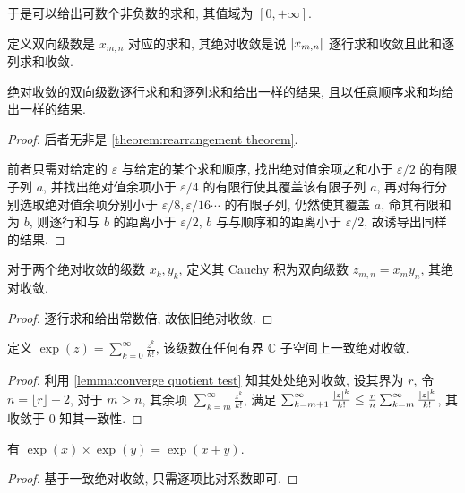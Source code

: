 于是可以给出可数个非负数的求和, 其值域为 \([0,+\infty]\).

\begin{definition}
    定义双向级数是 \(x_{m,n}\) 对应的求和, 其绝对收敛是说 \(\abs{x_{m,n}}\) 逐行求和收敛且此和逐列求和收敛.
\end{definition}

\begin{lemma}
    绝对收敛的双向级数逐行求和和逐列求和给出一样的结果, 且以任意顺序求和均给出一样的结果.

    \begin{proof}
        后者无非是 \ref{theorem:rearrangement theorem}.

        前者只需对给定的 \(\varepsilon\) 与给定的某个求和顺序, 找出绝对值余项之和小于 \(\varepsilon/2\) 的有限子列 \(a\),
        并找出绝对值余项小于 \(\varepsilon/4\) 的有限行使其覆盖该有限子列 \(a\), 再对每行分别选取绝对值余项分别小于 \(\varepsilon/8,\varepsilon/16 \cdots\) 的有限子列,
        仍然使其覆盖 \(a\), 命其有限和为 \(b\), 则逐行和与 \(b\) 的距离小于 \(\varepsilon/2\), \(b\) 与与顺序和的距离小于 \(\varepsilon/2\), 故诱导出同样的结果.
    \end{proof}
\end{lemma}

\begin{definition}[Cauchy 积]
    对于两个绝对收敛的级数 \(x_k,y_k\), 定义其 Cauchy 积为双向级数 \(z_{m,n} = x_m y_n\),
    其绝对收敛.

    \begin{proof}
        逐行求和给出常数倍, 故依旧绝对收敛.
    \end{proof}
\end{definition}

\begin{definition}[指数]
    定义 \(\exp (z) = \sum_{k=0}^{\infty} \frac{z^k}{k!}\), 该级数在任何有界 \(\mathbb{C}\) 子空间上一致绝对收敛.

    \begin{proof}
        利用 \ref{lemma:converge quotient test} 知其处处绝对收敛, 设其界为 \(r\), 令 \(n = \lfloor r \rfloor + 2\), 对于 \(m > n\), 其余项 \(\sum_{k=m}^{\infty} \frac{z^k}{k!}\),
        满足 \(\sum_{k=m+1}^{\infty} \frac{\abs{z}^k}{k!} \leq \frac{r}{n} \sum_{k=m}^{\infty} \frac{\abs{z}^k}{k!}\), 其收敛于 \(0\) 知其一致性.
    \end{proof}
\end{definition}

\begin{lemma}
    有 \(\exp (x) \times \exp (y) = \exp (x+y)\).

    \begin{proof}
        基于一致绝对收敛, 只需逐项比对系数即可.
    \end{proof}
\end{lemma}

